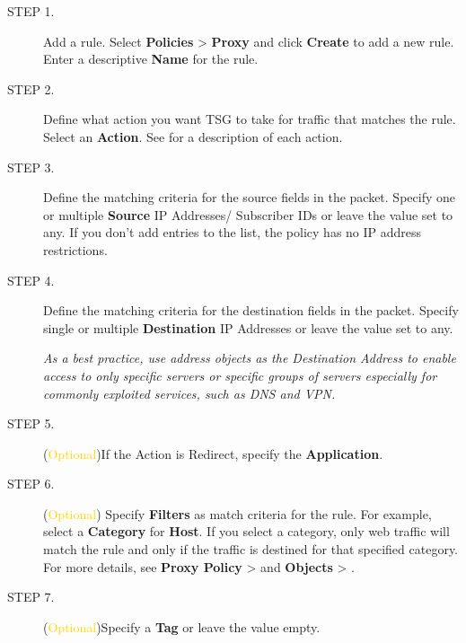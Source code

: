 \begin{description}
    \item[STEP 1.]	Add a rule. Select \textbf{Policies} > \textbf{Proxy} and click \textbf{Create} to add a new rule. Enter a descriptive \textbf{Name} for the rule.
    \item[STEP 2.]	Define what action you want TSG to take for traffic that matches the rule. Select an \textbf{Action}. See \hyperlink{link:Proxy Actions}{\color{linkblue}{Proxy Policy Actions}} for a description of each action.
    \item[STEP 3.]	Define the matching criteria for the source fields in the packet. Specify one or multiple \textbf{Source} IP Addresses/ Subscriber IDs or leave the value set to any. If you don’t add entries to the list, the policy has no IP address restrictions.
    \item[STEP 4.]	Define the matching criteria for the destination fields in the packet. Specify single or multiple \textbf{Destination} IP Addresses or leave the value set to any.


    \notemark\textit{As a best practice, use address objects as the Destination Address to enable access to only specific servers or specific groups of servers especially for commonly exploited services, such as DNS and VPN.}
    \item[STEP 5.]	(\textcolor{gold}{Optional})If the Action is Redirect, specify the \textbf{Application}.
    \item[STEP 6.]	(\textcolor{gold}{Optional}) Specify \textbf{Filters} as match criteria for the rule. For example, select a \textbf{Category} for \textbf{Host}. 
    If you select a category, only web traffic will match the rule and only if the traffic is destined for that specified category. 
    For more details, see \textbf{Proxy Policy} > \textbf{\hyperlink{link:Proxy Applications and Filters}{\color{linkblue}{Applications and Filters}}} and \textbf{Objects} > \textbf{\hyperlink{link:Applications}{\color{linkblue}{Applications}}}.
    \item[STEP 7.]	(\textcolor{gold}{Optional})Specify a \textbf{Tag} or leave the value empty.
    

\end{description}
